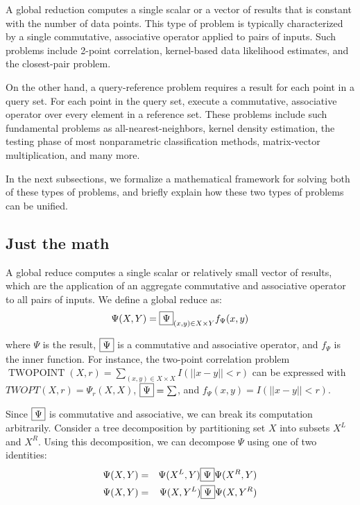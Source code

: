 \documentclass[times, 10pt,twocolumn]{article}
\DeclareMathOperator{\TWOPT}{TWOPOINT}
\newcommand{\kdleft}{^L}
\newcommand{\kdright}{^R}
\newcommand{\allpsi}{\Psi}
\newcommand{\Oppsi}{\fbox{$\Psi$}}
\newcommand{\oppsi}{\fbox{$\Psi$}}
\newcommand{\fpsi}{f_{\Psi}}
\begin{document}
A global reduction computes a single scalar or a vector of results that is constant with the number of data points.
This type of problem is typically characterized by a single commutative, associative operator applied to pairs of inputs.
Such problems include 2-point correlation, kernel-based data likelihood estimates, and the closest-pair problem.

On the other hand, a query-reference problem requires a result for each point in a query set.
For each point in the query set, execute a commutative, associative operator over every element in a reference set.
These problems include such fundamental problems as all-nearest-neighbors, kernel density estimation, the testing phase of most nonparametric classification methods, matrix-vector multiplication, and many more.

In the next subsections, we formalize a mathematical framework for solving both of these types of problems, and briefly explain how these two types of problems can be unified.

\subsection{Just the math}


A global reduce computes a single scalar or relatively small vector of results, which are the application of an aggregate commutative and associative operator to all pairs of inputs.
We define a global reduce as:
\begin{equation}
\allpsi(X, Y) = {\Oppsi}_{(x, y) \in X \times Y} \fpsi(x, y)
\label{eqn:defpsi}
\end{equation}

\noindent where $\allpsi$ is the result, $\Oppsi$ is a commutative and associative operator, and $\fpsi$ is the inner function.
For instance, the two-point correlation problem $\TWOPT(X, r) = \sum_{(x, y) \in X \times X} I(||x - y|| < r)$ can be expressed with $TWOPT(X, r) = \allpsi_r(X, X)$, $\Oppsi = \sum$, and $\fpsi(x, y) = I(||x - y|| < r)$.


Since $\Oppsi$ is commutative and associative, we can break its computation arbitrarily.
Consider a tree decomposition by partitioning set $X$ into subsets $X\kdleft$ and $X\kdright$.
Using this decomposition, we can decompose $\allpsi$ using one of two identities:
\begin{eqnarray}
\allpsi(X, Y) &=& \allpsi(X\kdleft, Y) \oppsi \allpsi(X\kdright, Y)
\\
\allpsi(X, Y) &=& \allpsi(X, Y\kdleft) \oppsi \allpsi(X, Y\kdright)
\label{eqn:dividepsi}
\end{eqnarray}
\end{document}
